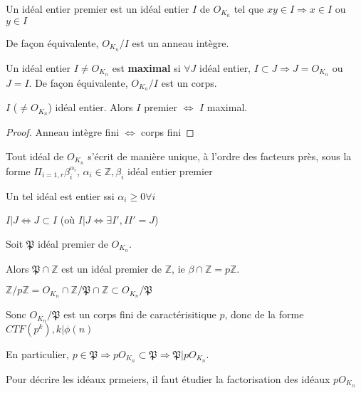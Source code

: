 \begin{definition}
Un idéal entier premier est un idéal entier $I$ de $O_{K_n}$ tel que $x y \in I \Rightarrow x \in I$ ou $y \in I$
\end{definition}

De façon équivalente, $O_{K_n}/I$ est un anneau intègre.

\begin{definition}
Un idéal entier $I \neq O_{K_n}$ est \textbf{maximal} si $\forall J$ idéal entier, $I \subset J \Rightarrow J=O_{K_n}$ ou $J=I$. De façon équivalente, $O_{K_n}/I$ est un corps.
\end{definition} 

\begin{proposition}
$I$ ($\neq O_{K_n}$) idéal entier. Alors $I$ premier $\Leftrightarrow$ $I$ maximal.
\end{proposition}

\begin{proof}
Anneau intègre fini $\Leftrightarrow$ corps fini
\end{proof}

\begin{theorem}
Tout idéal de $O_{K_n}$ s'écrit de manière unique, à l'ordre des facteurs près, sous la forme $\Pi_{i=1,r} \beta_i^{\alpha_i}$, $\alpha_i \in \mathbb{Z}, \beta_i$ idéal entier premier

Un tel idéal est entier ssi $\alpha_i \geq 0 \forall i$
\end{theorem}

\begin{corollary}
$I |J \Leftrightarrow J \subset I$ (où $I|J \Leftrightarrow \exists I', I I'=J$)
\end{corollary}

\begin{definition}
Soit $\mathfrak{P}$ idéal premier de $O_{K_n}$.

Alors $\mathfrak{P} \cap \mathbb{Z}$ est un idéal premier de $\mathbb{Z}$, ie $\beta \cap \mathbb{Z}= p \mathbb{Z}$.

$\mathbb{Z}/p \mathbb{Z} = O_{K_n} \cap \mathbb{Z}/ \mathfrak{P} \cap \mathbb{Z} \subset O_{K_n}/ \mathfrak{P}$

Sonc $O_{K_n}/ \mathfrak{P}$ est un corps fini de caractérisitique $p$, donc de la forme $CTF(p^k), k|\phi(n)$

En particulier, $p \in \mathfrak{P} \Rightarrow p O_{K_n} \subset \mathfrak{P} \Rightarrow \mathfrak{P} | p O_{K_n}$.

Pour décrire les idéaux prmeiers, il faut étudier la factorisation des idéaux $p O_{K_n}$
\end{definition}

